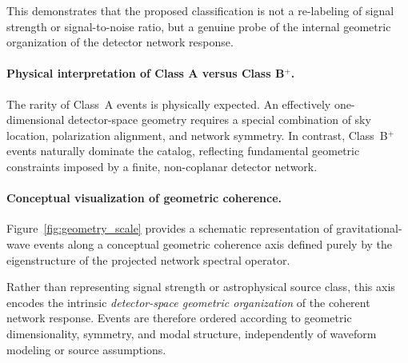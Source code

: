 \documentclass[11pt,a4paper]{article}
\begin{document}
This demonstrates that the proposed classification is not a re-labeling of signal
strength or signal-to-noise ratio, but a genuine probe of the internal geometric
organization of the detector network response.

\paragraph{Physical interpretation of Class A versus Class B$^+$.}
The rarity of Class~A events is physically expected.
An effectively one-dimensional detector-space geometry requires a special combination
of sky location, polarization alignment, and network symmetry.
In contrast, Class~B$^+$ events naturally dominate the catalog, reflecting fundamental
geometric constraints imposed by a finite, non-coplanar detector network.

\paragraph{Conceptual visualization of geometric coherence.}
Figure~\ref{fig:geometry_scale} provides a schematic representation of gravitational-wave
events along a conceptual geometric coherence axis defined purely by the eigenstructure
of the projected network spectral operator.

Rather than representing signal strength or astrophysical source class, this axis
encodes the intrinsic \emph{detector-space geometric organization} of the coherent
network response.
Events are therefore ordered according to geometric dimensionality, symmetry, and modal
structure, independently of waveform modeling or source assumptions.
\end{document}

